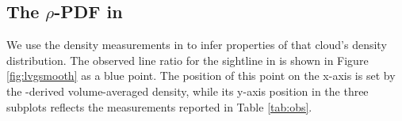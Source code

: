 \subsection{The $\rho$-PDF in \GRSMC}
\label{sec:grsmcturb}
We use the density measurements in \GRSMC to infer properties of that
cloud's density distribution.  The observed line ratio for the \north sightline in
\GRSMC is shown in Figure \ref{fig:lvgsmooth} as a blue point.  The position
of this point on the x-axis is set by the \thirteenco-derived volume-averaged density,
while its y-axis position in the three subplots reflects the \formaldehyde measurements
reported in Table \ref{tab:obs}.



